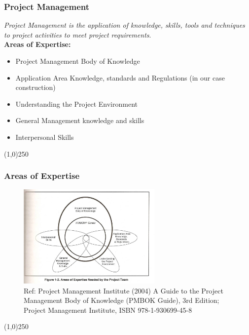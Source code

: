 \begin{frame}
\frametitle{Project Management}
\textit{Project Management is the application of knowledge, skills, tools and techniques to project activities to meet project requirements}.\\
\textbf{Areas of Expertise:}\\
\begin{itemize}
\item Project Management Body of Knowledge
\item Application Area Knowledge, standards and Regulations (in our case construction)
\item Understanding the Project Environment
\item General Management knowledge and skills
\item Interpersonal Skills
\end{itemize}
\end{frame}
\begin{center}\line(1,0){250}\end{center}



\begin{frame}
\frametitle{Areas of Expertise}

 \begin{figure}
 	\centering
 		\includegraphics[width = 7cm]{images/Fig1-2old.jpg}
	\caption{Ref: Project Management Institute (2004) A Guide to the Project Management Body of Knowledge (PMBOK Guide), 3rd Edition; Project Management Institute, ISBN 978-1-930699-45-8}
 	\label{fig:1-2old}
 \end{figure}
\end{frame}
\begin{center}\line(1,0){250}\end{center}




